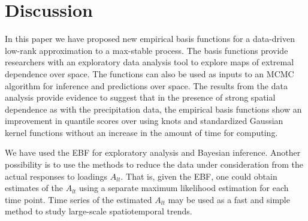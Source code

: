 \section{Discussion}\label{ebs:con}

In this paper we have proposed new empirical basis functions for a data-driven low-rank approximation to a max-stable process.
The basis functions provide researchers with an exploratory data analysis tool to explore maps of extremal dependence over space.
The functions can also be used as inputs to an MCMC algorithm for inference and predictions over space.
The results from the data analysis provide evidence to suggest that in the presence of strong spatial dependence as with the precipitation data, the empirical basis functions show an improvement in quantile scores over using knots and standardized Gaussian kernel functions without an increase in the amount of time for computing.

We have used the EBF for exploratory analysis and Bayesian inference.
Another possibility is to use the methods to reduce the data under consideration from the actual responses to loadings $A_{lt}$.
That is, given the EBF, one could obtain estimates of the $A_{lt}$ using a separate maximum likelihood estimation for each time point.
Time series of the estimated $A_{lt}$ may be used as a fast and simple method to study large-scale spatiotemporal trends.

